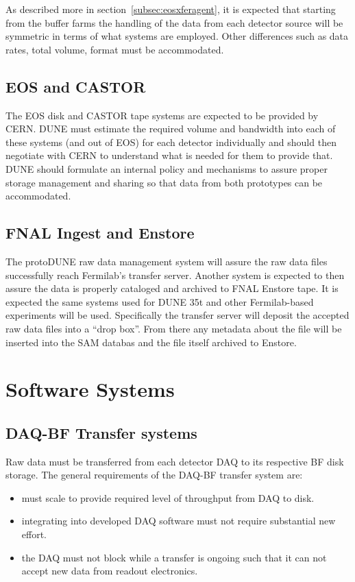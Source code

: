 \documentclass[pdftex,12pt,letter]{article}
\begin{document}
As described more in section~\ref{subsec:eosxferagent}, it is expected
that starting from the buffer farms the handling of the data from each
detector source will be symmetric in terms of what systems are
employed.  Other differences such as data rates, total volume, format
must be accommodated.

\subsection{EOS and CASTOR}

The EOS disk and CASTOR tape systems are expected to be provided by
CERN.  DUNE must estimate the required volume and bandwidth into each
of these systems (and out of EOS) for each detector individually and
should then negotiate with CERN to understand what is needed for them
to provide that.  DUNE should formulate an internal policy and
mechanisms to assure proper storage management and sharing so that
data from both prototypes can be accommodated.

\subsection{FNAL Ingest and Enstore}

The protoDUNE raw data management system will assure the raw data
files successfully reach Fermilab's transfer server.  Another system
is expected to then assure the data is properly cataloged and archived
to FNAL Enstore tape.  It is expected the same systems used for DUNE
35t and other Fermilab-based experiments will be used.  Specifically
the transfer server will deposit the accepted raw data files into a
``drop box''.  From there any metadata about the file will be inserted
into the SAM databas and the file itself archived to Enstore.

\section{Software Systems}

\subsection{DAQ-BF Transfer systems}

Raw data must be transferred from each detector DAQ to its respective
BF disk storage.  The general requirements of the DAQ-BF transfer
system are:

\begin{itemize}
\item must scale to provide required level of throughput from DAQ to disk.
\item integrating into developed DAQ software must not require
  substantial new effort.
\item the DAQ must not block while a transfer is ongoing such that it
  can not accept new data from readout electronics.
\end{itemize}
\end{document}
